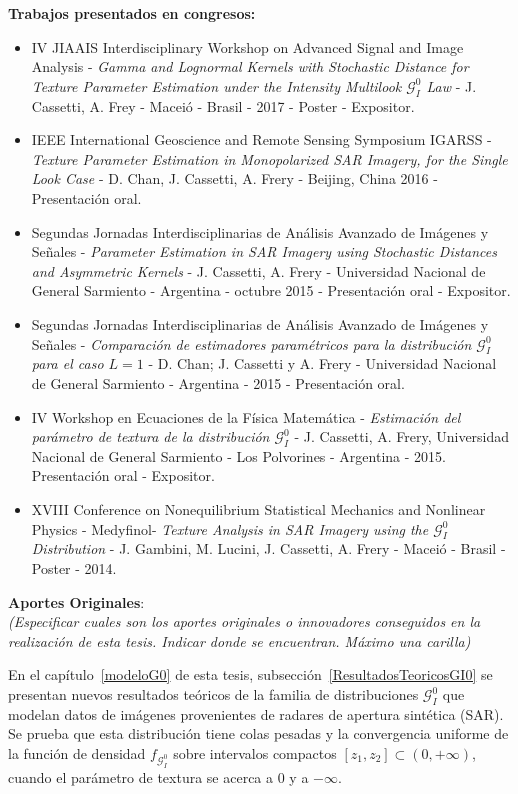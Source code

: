 \textbf{Trabajos presentados en congresos:}
\begin{itemize}
	\item  	IV JIAAIS Interdisciplinary Workshop on Advanced Signal and Image Analysis -  \emph{Gamma and Lognormal Kernels with Stochastic Distance for Texture Parameter Estimation under the Intensity Multilook $\mathcal{G}_I^0$ Law} - J. Cassetti, A. Frey - Maceió  - Brasil - 2017 - Poster -  Expositor.
	\item  IEEE International Geoscience and Remote Sensing Symposium IGARSS - \emph{Texture Parameter Estimation in Monopolarized SAR Imagery, for the Single Look Case} - D. Chan, J. Cassetti, A. Frery  - Beijing, China 2016 - Presentación oral.
	\item Segundas Jornadas Interdisciplinarias de Análisis Avanzado de Imágenes y Señales  - \emph{Parameter Estimation in SAR Imagery using Stochastic Distances and Asymmetric Kernels} - J. Cassetti, A. Frery - Universidad Nacional de General Sarmiento - Argentina - octubre 2015 - Presentación oral - Expositor.
	\item Segundas Jornadas Interdisciplinarias de Análisis Avanzado de Imágenes y Señales - \emph{Comparación de estimadores paramétricos para la distribución $\mathcal{G}_I^0$ para el caso $L = 1$} -  D. Chan; J. Cassetti y A. Frery - Universidad Nacional de General Sarmiento - Argentina - 2015  - Presentación oral.
	\item IV Workshop en Ecuaciones de la Física Matemática  - \emph{Estimación del parámetro de textura de la distribución $\mathcal{G}_I^0$} - J. Cassetti, A. Frery, Universidad Nacional de General Sarmiento - Los Polvorines - Argentina - 2015. Presentación oral - Expositor.
	\item XVIII Conference on Nonequilibrium Statistical Mechanics and Nonlinear Physics - Medyfinol- \emph{Texture Analysis in SAR Imagery using the $\mathcal{G}_I^0$ Distribution}  - J. Gambini,  M. Lucini, J. Cassetti, A. Frery - Maceió  - Brasil - Poster - 2014.
\end{itemize}
\newpage

\textbf{Aportes Originales}:\\
\emph{(Especificar cuales son los aportes originales o innovadores conseguidos en la realización de esta tesis. Indicar donde se encuentran. Máximo una carilla)}

\vspace{0.5cm}
En el capítulo~\ref{modeloG0} de esta tesis, subsección~\ref{ResultadosTeoricosGI0} se presentan nuevos resultados teóricos de la familia de distribuciones $\mathcal{G}_I^0$ que modelan datos de imágenes provenientes de radares de apertura sintética (SAR). Se prueba que esta distribución tiene colas pesadas y la convergencia uniforme de la función de densidad $f_{\mathcal{G}_I^0}$ sobre intervalos compactos $[z_1,z_2]\subset(0,+\infty)$, cuando el parámetro de textura se acerca a $0$ y a $-\infty$.

